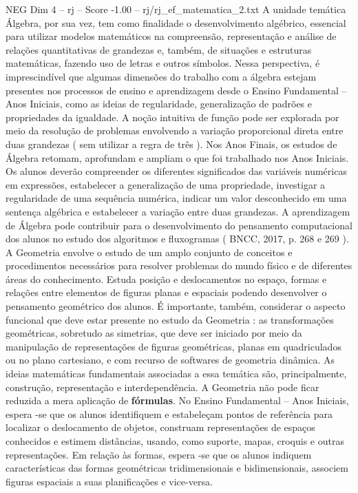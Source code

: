 \begin{textsample}{NEG Dim 4 – rj – Score -1.00 – rj/rj\_ef\_matematica\_2.txt}
A unidade temática Álgebra, por sua vez, tem como finalidade o desenvolvimento algébrico, essencial para utilizar modelos matemáticos na compreensão, representação e análise de relações quantitativas de grandezas e, também, de situações e estruturas matemáticas, fazendo uso de letras e outros símbolos.
Nessa perspectiva, é imprescindível que algumas dimensões do trabalho com a álgebra estejam presentes nos processos de ensino e aprendizagem desde o Ensino Fundamental – Anos Iniciais, como as ideias de regularidade, generalização de padrões e propriedades da igualdade.
A noção intuitiva de função pode ser explorada por meio da resolução de problemas envolvendo a variação proporcional direta entre duas grandezas ( sem utilizar a regra de três ).
Nos Anos Finais, os estudos de Álgebra retomam, aprofundam e ampliam o que foi trabalhado nos Anos Iniciais.
Os alunos deverão compreender os diferentes significados das variáveis numéricas em expressões, estabelecer a generalização de uma propriedade, investigar a regularidade de uma sequência numérica, indicar um valor desconhecido em uma sentença algébrica e estabelecer a variação entre duas grandezas.
A aprendizagem de Álgebra pode contribuir para o desenvolvimento do pensamento computacional dos alunos no estudo dos algoritmos e fluxogramas ( BNCC, 2017, p. 268 e 269 ).
A Geometria envolve o estudo de um amplo conjunto de conceitos e procedimentos necessários para resolver problemas do mundo físico e de diferentes áreas do conhecimento.
Estuda posição e deslocamentos no espaço, formas e relações entre elementos de figuras planas e espaciais podendo desenvolver o pensamento geométrico dos alunos.
É importante, também, considerar o aspecto funcional que deve estar presente no estudo da Geometria : as transformações geométricas, sobretudo as simetrias, que deve ser iniciado por meio da manipulação de representações de figuras geométricas, planas em quadriculados ou no plano cartesiano, e com recurso de softwares de geometria dinâmica.
As ideias matemáticas fundamentais associadas a essa temática são, principalmente, construção, representação e interdependência.
A Geometria não pode ficar reduzida a mera aplicação de \textbf{fórmulas}.
No Ensino Fundamental – Anos Iniciais, espera -se que os alunos identifiquem e estabeleçam pontos de referência para localizar o deslocamento de objetos, construam representações de espaços conhecidos e estimem distâncias, usando, como suporte, mapas, croquis e outras representações.
Em relação às formas, espera -se que os alunos indiquem características das formas geométricas tridimensionais e bidimensionais, associem figuras espaciais a suas planificações e vice-versa.

\end{textsample}
